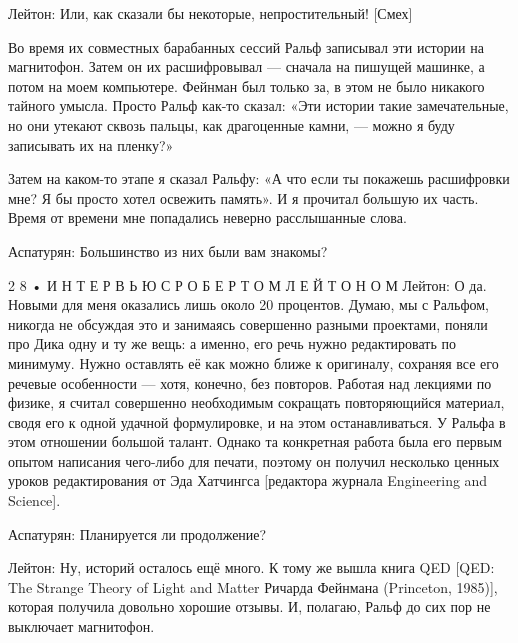 \documentclass[11pt,oneside]{article}
\begin{document}
Лейтон: Или, как сказали бы некоторые, непростительный! [Смех]\par



Во время их совместных барабанных сессий Ральф записывал эти истории на магнитофон. Затем он их расшифровывал --- сначала на пишущей машинке, а потом на моем компьютере. Фейнман был только за, в этом не было никакого тайного умысла. Просто Ральф как-то сказал: «Эти истории такие замечательные, но они утекают сквозь пальцы, как драгоценные камни, --- можно я буду записывать их на пленку?»\par



Затем на каком-то этапе я сказал Ральфу: «А что если ты покажешь расшифровки мне? Я бы просто хотел освежить память». И я прочитал большую их часть. Время от времени мне попадались неверно расслышанные слова.\par



Аспатурян: Большинство из них были вам знакомы?\par



2 8 • И Н Т Е Р В Ь Ю   С   Р О Б Е Р Т О М   Л Е Й Т О Н О М Лейтон: О да. Новыми для меня оказались лишь около 20 процентов. Думаю, мы с Ральфом, никогда не обсуждая это и занимаясь совершенно разными проектами, поняли про Дика одну и ту же вещь: а именно, его речь нужно редактировать по минимуму. Нужно оставлять её как можно ближе к оригиналу, сохраняя все его речевые особенности --- хотя, конечно, без повторов. Работая над лекциями по физике, я считал совершенно необходимым сокращать повторяющийся материал, сводя его к одной удачной формулировке, и на этом останавливаться. У Ральфа в этом отношении большой талант. Однако та конкретная работа была его первым опытом написания чего-либо для печати, поэтому он получил несколько ценных уроков редактирования от Эда Хатчингса [редактора журнала Engineering and Science].\par



Аспатурян: Планируется ли продолжение?\par



Лейтон: Ну, историй осталось ещё много. К тому же вышла книга QED [QED: The Strange Theory of Light and Matter Ричарда Фейнмана (Princeton, 1985)], которая получила довольно хорошие отзывы. И, полагаю, Ральф до сих пор не выключает магнитофон.\par
\end{document}
